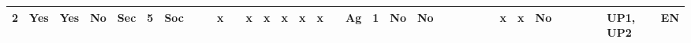 {\begin{table}
{\begin{tabular}{|l|l|l|l|l|l|l|l|l|l|l|l|l|l|l|l|l|l|l|l|l|l|l|l|l|l|l|l|l|l|l|l|l|l|l|}
2                                         & Yes                                                          & Yes                                                         & No                                                           & Sec                                                       & 5                                                        & Soc                                                           &                                      &                                     & x                                     &                                      & x                                    & x                                  & x                                   & x                                   &  x                                  &                                       & Ag                                                       & 1                                                           & No                                                          & No                                                           &                                                &                                        &                                    &                                       &                                  & x                                       & x                                    & No                                                         &                                                                &                                       &                                           &                                              & UP1, UP2                                 & EN                                          \\ \hline

\end{tabular}}
\end{table}}
